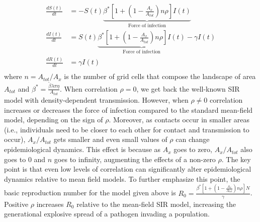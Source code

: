 \documentclass[letterpaper]{article}
\begin{document}
\begin{equation}
    \begin{aligned}
        \frac{d S(t)}{dt} &= - S(t) \underbrace{\beta^* [1 + (1 - \frac{A_x}{A_{tot}})n\rho] I(t)}_{\text{Force of infection}}  \\
        \frac{d I(t)}{dt} &=  S(t) \underbrace{\beta^* [1 + (1 - \frac{A_x}{A_{tot}})n\rho] I(t)}_{\text{Force of infection}} - \gamma I(t) \\
        \frac{d R(t)}{dt} &= \gamma I(t) \\
    \end{aligned}
    \label{eq:sir_with_corr}
\end{equation}
where $n = A_{tot} / A_{x}$ is the number of grid cells that compose the landscape of area $A_{tot}$ and $\beta^* = \frac{\tilde{\beta} \lambda \pi \eta}{A_{tot}}$. When correlation $\rho = 0$, we get back the well-known SIR model with density-dependent transmission.  However, when $\rho \neq 0$ correlation increases or decreases the force of infection compared to the standard mean-field model, depending on the sign of $\rho$.  Moreover, as contacts occur in smaller areas (i.e., individuals need to be closer to each other for contact and transmission to occur), $A_x / A_{tot}$ gets smaller and even small values of $\rho$ can change epidemiological dynamics.  This effect is because as $A_x$ goes to zero, $A_x / A_{tot}$ also goes to 0 and $n$ goes to infinity, augmenting the effects of a non-zero $\rho$. The key point is that even low levels of correlation can significantly alter epidemiological dynamics relative to mean field models.  To further emphasize this point, the basic reproduction number for the model given above is $R_0 = \frac{\beta^* [1 + (1 - \frac{A_x}{A_{tot}})n\rho] N}{\gamma}$. Positive $\rho$ increases $R_0$ relative to the mean-field SIR model, increasing the generational explosive spread of a pathogen invading a population.

\end{document}
